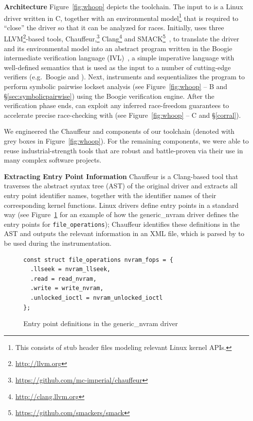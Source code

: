 \noindent\textbf{Architecture }
%
Figure~\ref{fig:whoop} depicts the \whoop toolchain. The input to \whoop is a Linux driver written in C, together with an environmental model\footnote{This consists of stub header files modeling relevant Linux kernel APIs.} that is required to ``close'' the driver so that it can be analyzed for races. Initially, \whoop uses three LLVM\footnote{\url{http://llvm.org}}-based tools, Chauffeur,\footnote{\url{https://github.com/mc-imperial/chauffeur}} Clang\footnote{\url{http://clang.llvm.org}} and SMACK\footnote{\url{https://github.com/smackers/smack}}~\cite{rakamaric2014smack}, to translate the driver and its environmental model into an abstract program written in the Boogie intermediate verification language (IVL)~\cite{deline2005boogiepl}, a simple imperative language with well-defined semantics that is used as the input to a number of cutting-edge verifiers (e.g.\ Boogie and \corral). Next, \whoop instruments and sequentializes the program to perform symbolic pairwise lockset analysis (see Figure~\ref{fig:whoop} -- B and \S\ref{sec:symbolicpairwise}) using the Boogie verification engine. After the verification phase ends, \whoop can exploit any inferred race-freedom guarantees to accelerate precise race-checking with \corral (see Figure~\ref{fig:whoop} -- C and \S\ref{corral}).

We engineered the Chauffeur and \whoop components of our toolchain (denoted with grey boxes in Figure~\ref{fig:whoop}).  For the remaining components, we were able to reuse industrial-strength tools that are robust and battle-proven via their use in many complex software projects.

\noindent\textbf{Extracting Entry Point Information }
%
Chauffeur is a Clang-based tool that traverses the abstract syntax tree (AST) of the original driver and extracts all entry point identifier names, together with the identifier names of their corresponding kernel functions. Linux drivers define entry points in a standard way (see Figure~\ref{fig:entrypoints} for an example of how the generic\_nvram driver defines the entry points for \texttt{file\_operations}); Chauffeur identifies these definitions in the AST and outputs the relevant information in an XML file, which is parsed by \whoop to be used during the instrumentation.

\begin{figure}[t]
\begin{lstlisting}
const struct file_operations nvram_fops = {
  .llseek = nvram_llseek,
  .read = read_nvram,
  .write = write_nvram,
  .unlocked_ioctl = nvram_unlocked_ioctl
};
\end{lstlisting}
\caption{Entry point definitions in the generic\_nvram driver}
\label{fig:entrypoints}
\end{figure}

